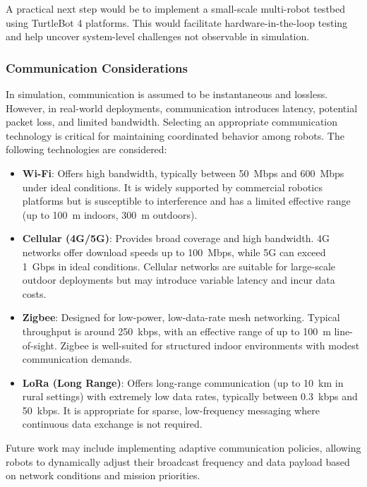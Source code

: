 A practical next step would be to implement a small-scale multi-robot testbed using TurtleBot 4 platforms. This would facilitate hardware-in-the-loop testing and help uncover system-level challenges not observable in simulation.

\subsubsection{Communication Considerations}
\label{sub:communication-methods}

In simulation, communication is assumed to be instantaneous and lossless. However, in real-world deployments, communication introduces latency, potential packet loss, and limited bandwidth. Selecting an appropriate communication technology is critical for maintaining coordinated behavior among robots. The following technologies are considered:

\begin{itemize}
  \item \textbf{Wi-Fi}: Offers high bandwidth, typically between \SI{50}{Mbps} and \SI{600}{Mbps} under ideal conditions. It is widely supported by commercial robotics platforms but is susceptible to interference and has a limited effective range (up to \SI{100}{m} indoors, \SI{300}{m} outdoors).
  \item \textbf{Cellular (4G/5G)}: Provides broad coverage and high bandwidth. 4G networks offer download speeds up to \SI{100}{Mbps}, while 5G can exceed \SI{1}{Gbps} in ideal conditions. Cellular networks are suitable for large-scale outdoor deployments but may introduce variable latency and incur data costs.
  \item \textbf{Zigbee}: Designed for low-power, low-data-rate mesh networking. Typical throughput is around \SI{250}{kbps}, with an effective range of up to \SI{100}{m} line-of-sight. Zigbee is well-suited for structured indoor environments with modest communication demands.
  \item \textbf{LoRa (Long Range)}: Offers long-range communication (up to \SI{10}{km} in rural settings) with extremely low data rates, typically between \SI{0.3}{kbps} and \SI{50}{kbps}. It is appropriate for sparse, low-frequency messaging where continuous data exchange is not required.
\end{itemize}

Future work may include implementing adaptive communication policies, allowing robots to dynamically adjust their broadcast frequency and data payload based on network conditions and mission priorities.

